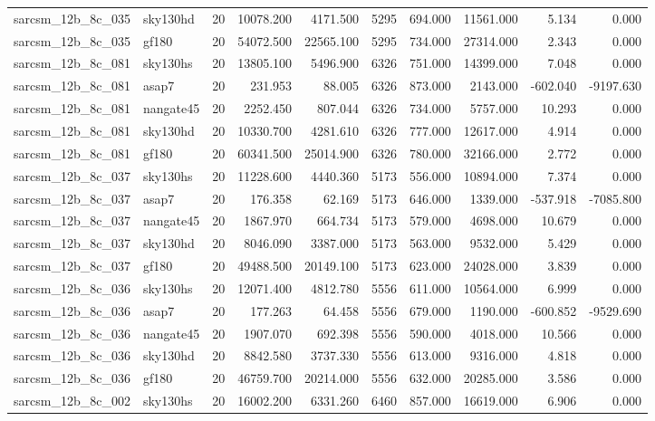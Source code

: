 \begin{longtable}{llrrrrrrrr}
sarcsm\_12b\_8c\_035 & sky130hd & 20 & 10078.200 & 4171.500 & 5295 & 694.000 & 11561.000 & 5.134 & 0.000 \\
sarcsm\_12b\_8c\_035 & gf180 & 20 & 54072.500 & 22565.100 & 5295 & 734.000 & 27314.000 & 2.343 & 0.000 \\
sarcsm\_12b\_8c\_081 & sky130hs & 20 & 13805.100 & 5496.900 & 6326 & 751.000 & 14399.000 & 7.048 & 0.000 \\
sarcsm\_12b\_8c\_081 & asap7 & 20 & 231.953 & 88.005 & 6326 & 873.000 & 2143.000 & -602.040 & -9197.630 \\
sarcsm\_12b\_8c\_081 & nangate45 & 20 & 2252.450 & 807.044 & 6326 & 734.000 & 5757.000 & 10.293 & 0.000 \\
sarcsm\_12b\_8c\_081 & sky130hd & 20 & 10330.700 & 4281.610 & 6326 & 777.000 & 12617.000 & 4.914 & 0.000 \\
sarcsm\_12b\_8c\_081 & gf180 & 20 & 60341.500 & 25014.900 & 6326 & 780.000 & 32166.000 & 2.772 & 0.000 \\
sarcsm\_12b\_8c\_037 & sky130hs & 20 & 11228.600 & 4440.360 & 5173 & 556.000 & 10894.000 & 7.374 & 0.000 \\
sarcsm\_12b\_8c\_037 & asap7 & 20 & 176.358 & 62.169 & 5173 & 646.000 & 1339.000 & -537.918 & -7085.800 \\
sarcsm\_12b\_8c\_037 & nangate45 & 20 & 1867.970 & 664.734 & 5173 & 579.000 & 4698.000 & 10.679 & 0.000 \\
sarcsm\_12b\_8c\_037 & sky130hd & 20 & 8046.090 & 3387.000 & 5173 & 563.000 & 9532.000 & 5.429 & 0.000 \\
sarcsm\_12b\_8c\_037 & gf180 & 20 & 49488.500 & 20149.100 & 5173 & 623.000 & 24028.000 & 3.839 & 0.000 \\
sarcsm\_12b\_8c\_036 & sky130hs & 20 & 12071.400 & 4812.780 & 5556 & 611.000 & 10564.000 & 6.999 & 0.000 \\
sarcsm\_12b\_8c\_036 & asap7 & 20 & 177.263 & 64.458 & 5556 & 679.000 & 1190.000 & -600.852 & -9529.690 \\
sarcsm\_12b\_8c\_036 & nangate45 & 20 & 1907.070 & 692.398 & 5556 & 590.000 & 4018.000 & 10.566 & 0.000 \\
sarcsm\_12b\_8c\_036 & sky130hd & 20 & 8842.580 & 3737.330 & 5556 & 613.000 & 9316.000 & 4.818 & 0.000 \\
sarcsm\_12b\_8c\_036 & gf180 & 20 & 46759.700 & 20214.000 & 5556 & 632.000 & 20285.000 & 3.586 & 0.000 \\
sarcsm\_12b\_8c\_002 & sky130hs & 20 & 16002.200 & 6331.260 & 6460 & 857.000 & 16619.000 & 6.906 & 0.000 \\

\end{longtable}
